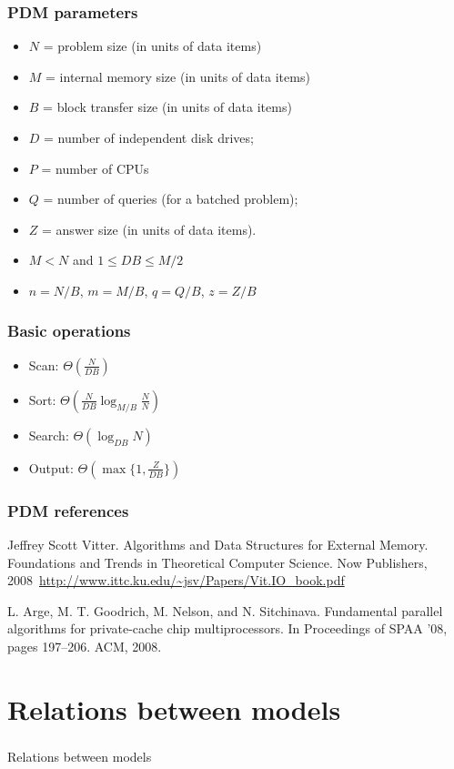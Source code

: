 \documentclass[12pt,aspectratio=169]{beamer}
\begin{document}
\begin{frame}\frametitle{PDM parameters}
  \begin{itemize}
  \item
    $N$ = problem size (in units of data items)
  \item
$M$ = internal memory size (in units of data items)
  \item
$B$ = block transfer size (in units of data items)
  \item
$D$ = number of independent disk drives;
  \item
$P$ = number of CPUs
\item
  $Q$ = number of queries (for a batched problem);
  \item
$Z$ = answer size (in units of data items).
  \item
    $M < N$ and $1 \le DB \le M/2$
  \item
    $n=N/B$, $m=M/B$, $q=Q/B$, $z=Z/B$
  \end{itemize}
\end{frame}


\begin{frame}\frametitle{Basic operations}
  \begin{itemize}
  \item
    Scan: $\Theta(\frac{N}{DB})$
  \item
    Sort: $\Theta(\frac{N}{DB} \log_{M/B} \frac{N}{N})$
  \item
    Search: $\Theta(\log_{DB}N)$
  \item
    Output: $\Theta(\max\{1, \frac{Z}{DB}\})$
  \end{itemize}
\end{frame}

\begin{frame}\frametitle{PDM references}
Jeffrey Scott Vitter.
Algorithms and Data Structures for External Memory.
Foundations and Trends in Theoretical Computer Science.
Now Publishers, 2008~\url{http://www.ittc.ku.edu/~jsv/Papers/Vit.IO_book.pdf}

L. Arge, M. T. Goodrich, M. Nelson, and N. Sitchinava. Fundamental
parallel algorithms for private-cache chip multiprocessors. In Proceedings
of SPAA ’08, pages 197–206. ACM, 2008.
\end{frame}

  \section{Relations between models}
\begin{frame}\frametitle{}
  \begin{center}
    \Huge
    Relations between models
  \end{center}
\end{frame}
\end{document}

